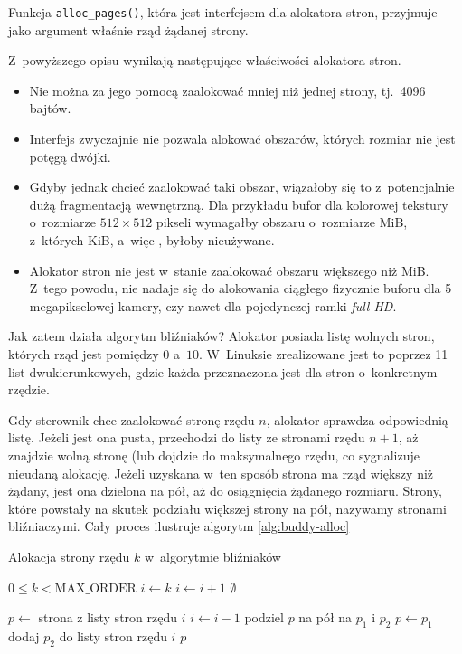 Funkcja \lstinline|alloc_pages()|, która jest interfejsem dla
alokatora stron, przyjmuje jako argument właśnie rząd żądanej strony.

Z~powyższego opisu wynikają następujące właściwości alokatora stron.

\begin{itemize}
\item Nie można za jego pomocą zaalokować mniej niż jednej strony,
  tj.\ 4096 bajtów.
\item Interfejs zwyczajnie nie pozwala alokować obszarów, których
  rozmiar nie jest potęgą dwójki.
\item Gdyby jednak chcieć zaalokować taki obszar, wiązałoby się to
  z~potencjalnie dużą fragmentacją wewnętrzną.  Dla przykładu bufor
  dla kolorowej tekstury o~rozmiarze $512 \times 512$ pikseli
  wymagałby obszaru o~rozmiarze \unit[1]{MiB}, z~których
  \unit[256]{KiB}, a~więc , byłoby nieużywane.
\item Alokator stron nie jest w~stanie zaalokować obszaru większego
  niż \unit[4]{MiB}.  Z~tego powodu, nie nadaje się do alokowania
  ciągłego fizycznie buforu dla 5 megapikselowej kamery, czy nawet dla
  pojedynczej ramki {\it full HD}.
\end{itemize}

Jak zatem działa algorytm bliźniaków?  Alokator posiada listę wolnych
stron, których rząd jest pomiędzy $0$ a~$10$.  W~Linuksie zrealizowane
jest to poprzez 11 list dwukierunkowych, gdzie każda przeznaczona jest
dla stron o~konkretnym rzędzie.

Gdy sterownik chce zaalokować stronę rzędu $n$, alokator sprawdza
odpowiednią listę.  Jeżeli jest ona pusta, przechodzi do listy ze
stronami rzędu $n+1$, aż znajdzie wolną stronę (lub dojdzie do
maksymalnego rzędu, co sygnalizuje nieudaną alokację.  Jeżeli uzyskana
w~ten sposób strona ma rząd większy niż żądany, jest ona dzielona na
pół, aż do osiągnięcia żądanego rozmiaru.  Strony, które powstały na
skutek podziału większej strony na pół, nazywamy stronami
bliźniaczymi.  Cały proces ilustruje algorytm \ref{alg:buddy-alloc}

\begin{algorithm}\label{alg:buddy-alloc}
\caption{Alokacja strony rzędu $k$ w~algorytmie bliźniaków}
\begin{algorithmic}[1]
\Require $0 \leq k < \mathrm{MAX\_ORDER}$
    \State $i \gets k$
        \State $i \gets i + 1$
            \State \Return $\emptyset$
        \EndIf
    \EndWhile

    \State $p \gets$ strona z listy stron rzędu $i$
        \State $i \gets i - 1$
        \State podziel $p$ na pół na $p_1$ i $p_2$
        \State $p \gets p_1$
        \State dodaj $p_2$ do listy stron rzędu $i$
    \EndWhile
    \State \Return $p$
\EndFunction
\end{algorithmic}
\end{algorithm}

